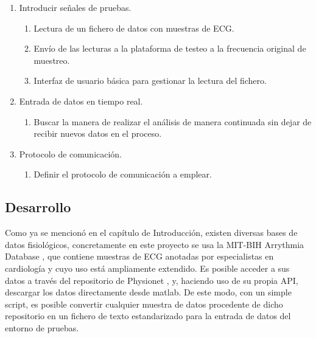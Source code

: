         \begin{enumerate}
                \item Introducir señales de pruebas.
                \begin{enumerate}
                        \item Lectura de un fichero de datos con muestras de ECG.
                        \item Envío de las lecturas a la plataforma de testeo a la frecuencia original de muestreo.
                        \item Interfaz de usuario básica para gestionar la lectura del fichero.
                \end{enumerate}
                \item Entrada de datos en tiempo real.
                \begin{enumerate}
                        \item Buscar la manera de realizar el análisis de manera continuada sin dejar de recibir nuevos datos en el proceso.
                \end{enumerate}
                \item Protocolo de comunicación.
                \begin{enumerate}
                        \item Definir el protocolo de comunicación a emplear.
                \end{enumerate}
        \end{enumerate}

    \subsection{Desarrollo}

        Como ya se mencionó en el capítulo de Introducción, existen diversas bases de datos fisiológicos, concretamente en este proyecto se usa la MIT-BIH Arrythmia Database \cite{MIT-BIH}, que contiene  muestras de ECG anotadas por especialistas en cardiología y cuyo uso está ampliamente extendido. Es posible acceder a sus datos a través del repositorio de Physionet \cite{phisionet}, y, haciendo uso de su propia API, descargar los datos directamente desde matlab. De este modo, con un simple script, es posible convertir cualquier muestra de datos procedente de dicho repositorio en un fichero de texto estandarizado para la entrada de datos del entorno de pruebas.
        

